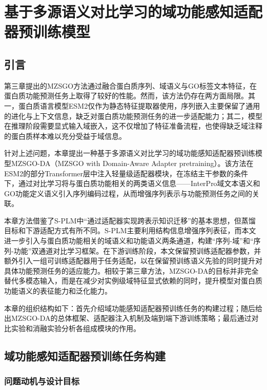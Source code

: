 
\chapter{基于多源语义对比学习的域功能感知适配器预训练模型}

\section{引言}

第三章提出的MZSGO方法通过融合蛋白质序列、域语义与GO标签文本特征，在蛋白质功能预测任务上取得了较好的性能。然而，该方法仍存在两方面局限。其一，蛋白质语言模型ESM2仅作为静态特征提取器使用，序列嵌入主要保留了通用的进化与上下文信息，缺乏对蛋白质功能预测任务的进一步适配能力；其二，模型在推理阶段需要显式输入域嵌入，这不仅增加了特征准备流程，也使得缺乏域注释的蛋白质样本难以充分受益于域信息。

针对上述问题，本章提出一种基于多源语义对比学习的域功能感知适配器预训练模型MZSGO-DA（MZSGO with Domain-Aware Adapter pretraining）。该方法在ESM2的部分Transformer层中注入轻量级适配器模块，在冻结主干参数的条件下，通过对比学习将与蛋白质功能相关的两类语义信息——InterPro域文本语义和GO功能定义语义引入序列编码过程，从而增强序列表示与功能预测任务之间的关联。

本章方法借鉴了S-PLM\cite{wang2025splm}中“通过适配器实现跨表示知识迁移”的基本思想，但蒸馏目标和下游适配方式有所不同。S-PLM主要利用结构信息增强序列表征，而本文进一步引入与蛋白质功能相关的域语义和功能语义两条通道，构建“序列-域”和“序列-功能”双通道对比学习框架。在下游训练阶段，本文保留预训练适配器参数，并额外引入一组可训练适配器用于任务适配，以在保留预训练语义先验的同时提升对具体功能预测任务的适应能力。相较于第三章方法，MZSGO-DA的目标并非完全替代多模态输入，而是在减少对实例级域特征显式依赖的同时，提升模型对蛋白质功能语义的表征能力和泛化能力。

本章的组织结构如下：首先介绍域功能感知适配器预训练任务的构建过程；随后给出MZSGO-DA的总体框架、适配器注入机制及端到端下游训练策略；最后通过对比实验和消融实验分析各组成模块的作用。

\section{域功能感知适配器预训练任务构建}

\subsection{问题动机与设计目标}

